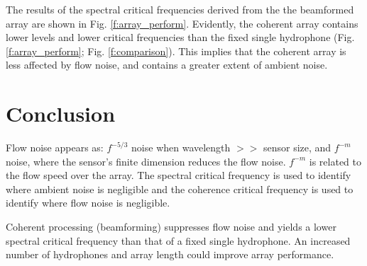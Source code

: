 \documentclass[12pt,journal,onecolumn]{IEEEtran}
\begin{document}
The results of the spectral critical frequencies derived from the the beamformed array are shown in Fig. \ref{f:array_perform}. Evidently, the coherent array contains lower levels and lower critical frequencies than the fixed single hydrophone (Fig. \ref{f:array_perform}; Fig. \ref{f:comparison}). This implies that the coherent array is less affected by flow noise, and contains a greater extent of ambient noise. 

\section{Conclusion}
Flow noise appears as: $f^{-5/3}$ noise when wavelength $>>$ sensor size, and $f^{-m}$ noise, where the sensor's finite dimension reduces the flow noise. $f^{-m}$ is related to the flow speed over the array. The spectral critical frequency is used to identify where ambient noise is negligible and the coherence critical frequency is used to identify where flow noise is negligible. 

Coherent processing (beamforming) suppresses flow noise and yields a lower spectral critical frequency than that of a fixed single hydrophone. An increased number of hydrophones and array length could improve array performance.




\end{document}
